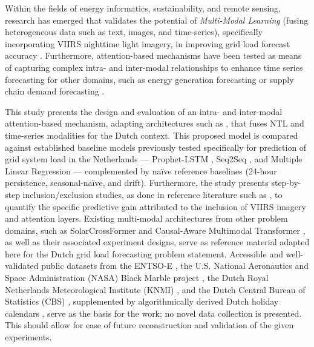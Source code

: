 Within the fields of energy informatics, sustainability, and remote sensing, research has emerged that validates the potential of \textit{Multi-Modal Learning} (fusing heterogeneous data such as text, images, and time-series), specifically incorporating VIIRS nighttime light imagery, in improving grid load forecast accuracy \cite{chen_monthly_2025,r_forecasting_2025,borunda_machine_2025}. Furthermore, attention-based mechanisms have been tested as means of capturing complex intra- and inter-modal relationships to enhance time series forecasting for other domains, such as energy generation forecasting \cite{schubnel_solarcrossformer_2025} or supply chain demand forecasting \cite{wang_causal-aware_2025}.

This study presents the design and evaluation of an intra- and inter-modal attention-based mechanism, adapting architectures such as \cite{schubnel_solarcrossformer_2025,wang_causal-aware_2025}, that fuses NTL and time-series modalities for the Dutch context. This proposed model is compared against established baseline models previously tested specifically for prediction of grid system load in the Netherlands --- Prophet-LSTM \cite{van_de_sande_enhancing_2024}, Seq2Seq \cite{ashtar_hybrid_2025}, and Multiple Linear Regression --- complemented by na\"ive reference baselines (24-hour persistence, seasonal-na\"ive, and drift). Furthermore, the study presents step-by-step inclusion/exclusion studies, as done in reference literature such as \cite{wang_causal-aware_2025}, to quantify the specific predictive gain attributed to the inclusion of VIIRS imagery and attention layers. Existing multi-modal architectures from other problem domains, such as SolarCrossFormer \cite{schubnel_solarcrossformer_2025} and Causal-Aware Multimodal Transformer \cite{wang_causal-aware_2025}, as well as their associated experiment designs, serve as reference material adapted here for the Dutch grid load forecasting problem statement. Accessible and well-validated public datasets from the ENTSO-E \cite{entsoe_power_stats}, the U.S. National Aeronautics and Space Administration (NASA) Black Marble project \cite{nasa_viirs_vnp46a2}, the Dutch Royal Netherlands Meteorological Institute (KNMI) \cite{knmi_hourly_obs}, and the Dutch Central Bureau of Statistics (CBS) \cite{cbs_statline}, supplemented by algorithmically derived Dutch holiday calendars \cite{holidays_python,openholidays_api}, serve as the basis for the work; no novel data collection is presented. This should allow for ease of future reconstruction and validation of the given experiments.

